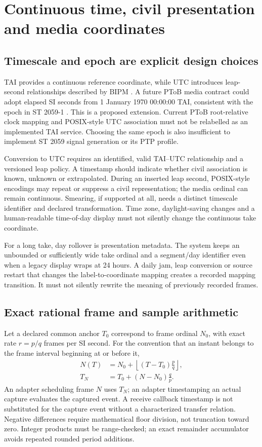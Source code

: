 \documentclass[11pt,letterpaper]{article}
\begin{document}
\section{Continuous time, civil presentation and media coordinates}\label{sec:mapping}
\subsection{Timescale and epoch are explicit design choices}
TAI provides a continuous reference coordinate, while UTC introduces leap-second relationships described by BIPM \cite{bipm}. A future PToB media contract could adopt elapsed SI seconds from 1 January 1970 00:00:00 TAI, consistent with the epoch in ST 2059-1 \cite{st2059}. This is a proposed extension. Current PToB root-relative clock mapping and POSIX-style UTC association must not be relabelled as an implemented TAI service. Choosing the same epoch is also insufficient to implement ST 2059 signal generation or its PTP profile.

Conversion to UTC requires an identified, valid TAI--UTC relationship and a versioned leap policy. A timestamp should indicate whether civil association is known, unknown or extrapolated. During an inserted leap second, POSIX-style encodings may repeat or suppress a civil representation; the media ordinal can remain continuous. Smearing, if supported at all, needs a distinct timescale identifier and declared transformation. Time zone, daylight-saving changes and a human-readable time-of-day display must not silently change the continuous take coordinate.

For a long take, day rollover is presentation metadata. The system keeps an unbounded or sufficiently wide take ordinal and a segment/day identifier even when a legacy display wraps at 24 hours. A daily jam, leap conversion or source restart that changes the label-to-coordinate mapping creates a recorded mapping transition. It must not silently rewrite the meaning of previously recorded frames.

\subsection{Exact rational frame and sample arithmetic}
Let a declared common anchor $T_0$ correspond to frame ordinal $N_0$, with exact rate $r=p/q$ frames per SI second. For the convention that an instant belongs to the frame interval beginning at or before it,
\begin{align}
 N(T)&=N_0+\left\lfloor (T-T_0)\frac{p}{q}\right\rfloor,\label{eq:frame}\\
 T_N&=T_0+(N-N_0)\frac{q}{p}.\label{eq:boundary}
\end{align}
An adapter scheduling frame $N$ uses $T_N$; an adapter timestamping an actual capture evaluates the captured event. A receive callback timestamp is not substituted for the capture event without a characterized transfer relation. Negative differences require mathematical floor division, not truncation toward zero. Integer products must be range-checked; an exact remainder accumulator avoids repeated rounded period additions.
\end{document}
